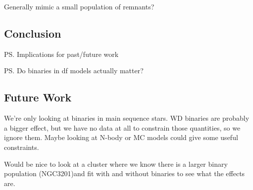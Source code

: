 Generally mimic a small population of remnants?









\subsection{Conclusion}

\ps{Implications for past/future work}

\ps{Do binaries in df models actually matter?}








\subsection{Future Work}

We're only looking at binaries in main sequence stars. WD binaries are probably a bigger effect, but
we have no data at all to constrain those quantities, so we ignore them. Maybe looking at N-body or
MC models could give some useful constraints.

Would be nice to look at a cluster where we know there is a larger binary population (NGC3201)and
fit with and without binaries to see what the effects are.